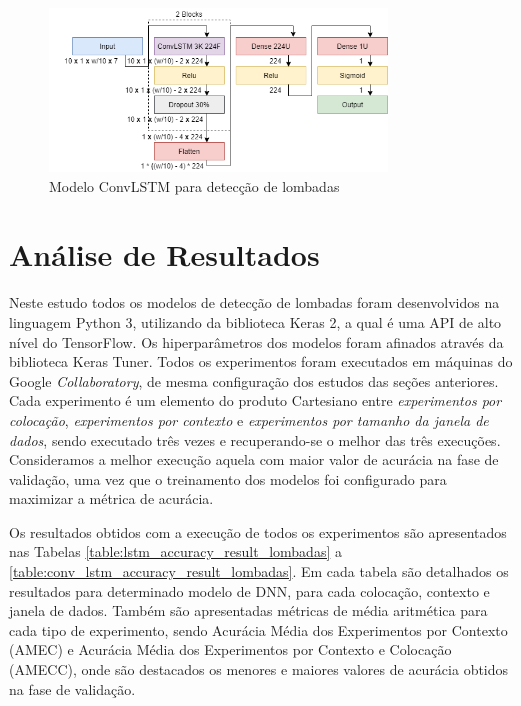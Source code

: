 \begin{figure}[h!]
  \centering
  \caption{Modelo ConvLSTM para detecção de lombadas}
  \label{fig:best_conv_lstm_tipo_lombadas}
  \includegraphics[width=0.8\textwidth]{figuras/fig_44.png}
\end{figure}

\section{Análise de Resultados}

Neste estudo todos os modelos de detecção de lombadas foram desenvolvidos na linguagem Python 3, utilizando da biblioteca Keras 2, a qual é uma API de alto nível do TensorFlow. Os hiperparâmetros dos modelos foram afinados através da biblioteca Keras Tuner. Todos os experimentos foram executados em máquinas do Google \textit{Collaboratory}, de mesma configuração dos estudos das seções anteriores. Cada experimento é um elemento do produto Cartesiano entre \emph{experimentos por colocação}, \emph{experimentos por contexto} e \emph{experimentos por tamanho da janela de dados}, sendo executado três vezes e recuperando-se o melhor das três execuções. Consideramos a melhor execução aquela com maior valor de acurácia na fase de validação, uma vez que o treinamento dos modelos foi configurado para maximizar a métrica de acurácia.

Os resultados obtidos com a execução de todos os experimentos são apresentados nas Tabelas \ref{table:lstm_accuracy_result_lombadas} a \ref{table:conv_lstm_accuracy_result_lombadas}. Em cada tabela são detalhados os resultados para determinado modelo de DNN, para cada colocação, contexto e janela de dados. Também são apresentadas métricas de média aritmética para cada tipo de experimento, sendo Acurácia Média dos Experimentos por Contexto (AMEC) e Acurácia Média dos Experimentos por Contexto e Colocação (AMECC), onde são destacados os menores e maiores valores de acurácia obtidos na fase de validação.

